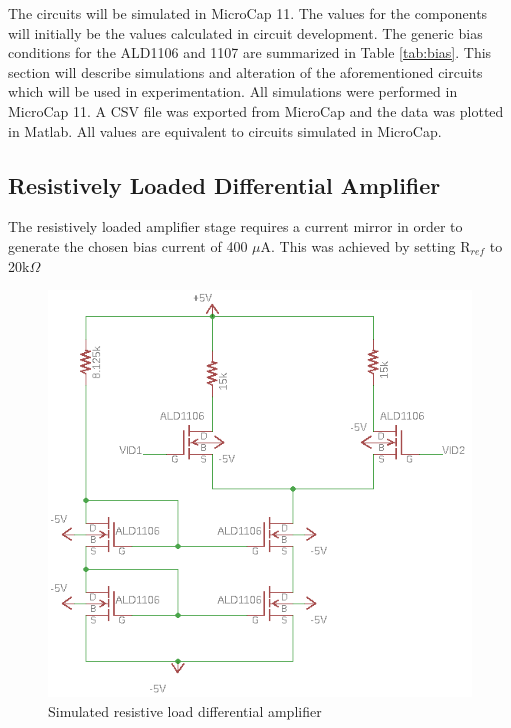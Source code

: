The circuits will be simulated in MicroCap 11. The values for the components will initially be the values calculated in circuit development. The generic bias conditions for the ALD1106 and 1107 are summarized in Table \ref{tab:bias}. This section will describe simulations and alteration of the aforementioned circuits which will be used in experimentation. All simulations were performed in MicroCap 11. A CSV file was exported from MicroCap and the data was plotted in Matlab. All values are equivalent to circuits simulated in MicroCap. 

\subsection{Resistively Loaded Differential Amplifier}

The resistively loaded amplifier stage requires a current mirror in order to generate the chosen bias current of 400 $\mu$A. This was achieved by setting R$_{ref}$ to 20k$\Omega$
\begin{figure}[H]
    \begin{center}
    \includegraphics[scale=.85]{Simulations/ResLoadedSimulated.png}
    \caption{Simulated resistive load differential amplifier}
    \label{fig:ResLoadSim}
    \end{center}
\end{figure}

